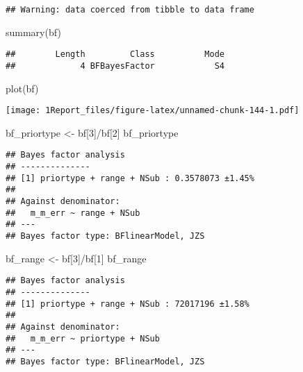 \documentclass[
]{article}
\newenvironment{Shaded}{\begin{snugshade}}{\end{snugshade}}
\newcommand{\DecValTok}[1]{\textcolor[rgb]{0.00,0.00,0.81}{#1}}
\newcommand{\FunctionTok}[1]{\textcolor[rgb]{0.00,0.00,0.00}{#1}}
\newcommand{\NormalTok}[1]{#1}
\newcommand{\OtherTok}[1]{\textcolor[rgb]{0.56,0.35,0.01}{#1}}
\newcommand{\SpecialCharTok}[1]{\textcolor[rgb]{0.00,0.00,0.00}{#1}}
\begin{document}
\begin{verbatim}
## Warning: data coerced from tibble to data frame
\end{verbatim}

\begin{Shaded}
\begin{Highlighting}[]
\FunctionTok{summary}\NormalTok{(bf)}
\end{Highlighting}
\end{Shaded}

\begin{verbatim}
##        Length         Class          Mode 
##             4 BFBayesFactor            S4
\end{verbatim}

\begin{Shaded}
\begin{Highlighting}[]
\FunctionTok{plot}\NormalTok{(bf)}
\end{Highlighting}
\end{Shaded}

\texttt{[image: 1Report\_files/figure-latex/unnamed-chunk-144-1.pdf]}

\begin{Shaded}
\begin{Highlighting}[]
\NormalTok{ bf\_priortype }\OtherTok{\textless{}{-}}\NormalTok{ bf[}\DecValTok{3}\NormalTok{]}\SpecialCharTok{/}\NormalTok{bf[}\DecValTok{2}\NormalTok{]}
\NormalTok{ bf\_priortype}
\end{Highlighting}
\end{Shaded}

\begin{verbatim}
## Bayes factor analysis
## --------------
## [1] priortype + range + NSub : 0.3578073 ±1.45%
## 
## Against denominator:
##   m_m_err ~ range + NSub 
## ---
## Bayes factor type: BFlinearModel, JZS
\end{verbatim}

\begin{Shaded}
\begin{Highlighting}[]
\NormalTok{bf\_range }\OtherTok{\textless{}{-}}\NormalTok{ bf[}\DecValTok{3}\NormalTok{]}\SpecialCharTok{/}\NormalTok{bf[}\DecValTok{1}\NormalTok{]}
\NormalTok{bf\_range}
\end{Highlighting}
\end{Shaded}

\begin{verbatim}
## Bayes factor analysis
## --------------
## [1] priortype + range + NSub : 72017196 ±1.58%
## 
## Against denominator:
##   m_m_err ~ priortype + NSub 
## ---
## Bayes factor type: BFlinearModel, JZS
\end{verbatim}
\end{document}
